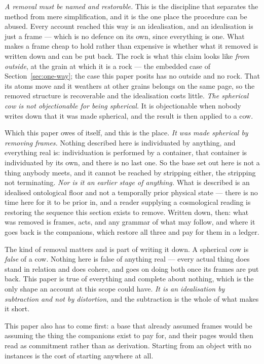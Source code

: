 \documentclass[11pt,a4paper]{article}
\theoremstyle{remark}\newtheorem{remark}[proposition]{Remark}
\begin{document}
\emph{A removal must be named and restorable.} This is the discipline that separates the method from
mere simplification, and it is the one place the procedure can be abused. Every account reached this way
is an idealisation, and an idealisation is just a frame --- which is no defence on its own, since
everything is one. What makes a frame cheap to hold rather than expensive is whether what it removed is
written down and can be put back. The rock is what this claim looks like \emph{from outside}, at the grain at which it is a
rock --- the embedded case of Section~\ref{sec:one-way}; the case this paper posits has no outside and
no rock. That its atoms move and it weathers at other grains belongs on the same page, so the removed
structure is recoverable and the idealisation costs little. \emph{The spherical cow is not objectionable
for being spherical.} It is objectionable when nobody writes down that it was made spherical, and the result is then applied
to a cow.

Which this paper owes of itself, and this is the place. \emph{It was made spherical by removing frames.}
Nothing described here is individuated by anything, and everything real is: individuation is performed
by a container, that container is individuated by its own, and there is no last one. So the base set out
here is not a thing anybody meets, and it cannot be reached by stripping either, the stripping not
terminating. \emph{Nor is it an earlier stage of anything.} What is described is an idealised
ontological floor and not a temporally prior physical state --- there is no time here for it to be
prior in, and a reader supplying a cosmological reading is restoring the sequence this section exists
to remove. Written down, then: what was removed is frames, acts, and any grammar of what may follow,
and where it goes back is the companions, which restore all three and pay for them in a ledger.

The kind of removal matters and is part of writing it down. A spherical cow is \emph{false} of a cow.
Nothing here is false of anything real --- every actual thing does stand in relation and does cohere,
and goes on doing both once its frames are put back. This paper is true of everything and complete about
nothing, which is the only shape an account at this scope could have. \emph{It is an idealisation by
subtraction and not by distortion}, and the subtraction is the whole of what makes it short.

This paper also has to come first: a base that already assumed
frames would be assuming the thing the companions exist to pay for, and their pages would then read as
commitment rather than as derivation. Starting from an object with no instances is the cost of starting
anywhere at all.
\end{document}
